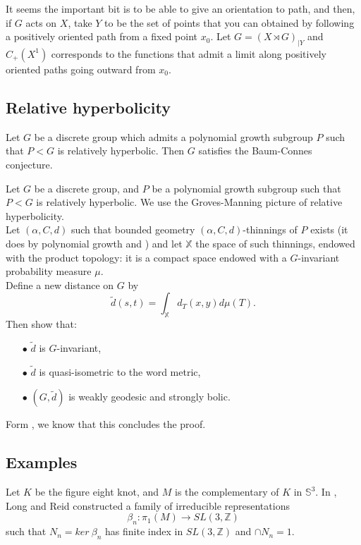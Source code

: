It seems the important bit is to be able to give an orientation to path, and then, if $G$ acts on $X$, take $Y$ to be the set of points that you can obtained by following a positively oriented path from a fixed point $x_0$. Let $G= (X\rtimes G)_{|Y}$ and $C_+(X^1)$ corresponds to the functions that admit a limit along positively oriented paths going outward from $x_0$.\\ 

\subsection{Relative hyperbolicity}

\begin{prop} Let $G$ be a discrete group which admits a polynomial growth subgroup $P$ such that $P<G$ is relatively hyperbolic. Then $G$ satisfies the Baum-Connes conjecture.
\end{prop}

Let $G$ be a discrete group, and $P$ be a polynomial growth subgroup such that $P<G$ is relatively hyperbolic. We use the Groves-Manning picture of relative hyperbolicity. \\

Let $(\alpha, C,d)$ such that bounded geometry $(\alpha, C ,d )$-thinnings of $P$ exists (it does by polynomial growth and \cite{guentnerproper}) and let $\mathbb X$ the space of such thinnings, endowed with the product topology: it is a compact space endowed with a $G$-invariant probability measure $\mu$.\\

Define a new distance on $G$ by
\[\tilde d (s,t) = \int_{\mathbb X} d_T(x,y) d\mu (T).\]
Then show that:
\begin{itemize}
\item[$\bullet$] $\tilde d$ is $G$-invariant,
\item[$\bullet$] $\tilde d$ is quasi-isometric to the word metric,
\item[$\bullet$] $(G,\tilde d)$ is weakly geodesic and strongly bolic.
\end{itemize}
Form \cite{mineyev2002baum}, we know that this concludes the proof.

\subsection{Examples}

Let $K$ be the figure eight knot, and $M$ is the complementary of $K$ in $\mathbb S^3$. In \cite{long2011small}, Long and Reid constructed a family of irreducible representations 
\[\beta_n : \pi_1 (M) \rightarrow SL(3,\mathbb Z)\]
such that $N_n = ker \ \beta_n $ has finite index in $SL(3,\mathbb Z)$ and $\cap N_n = 1$.\\

